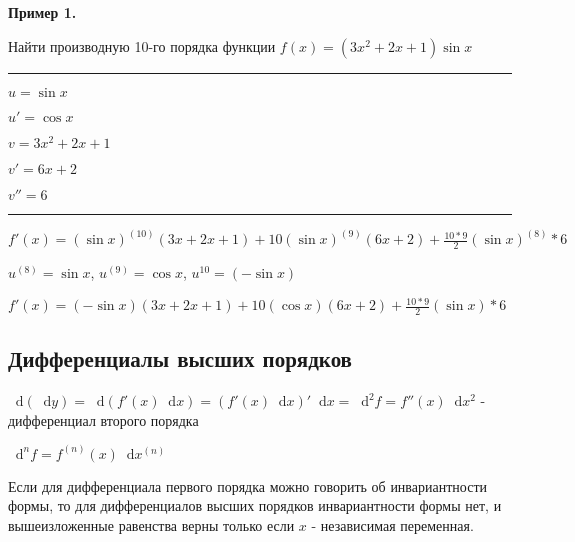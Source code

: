 \documentclass{article}
\newcommand*\diff{\mathop{}\!\mathrm{d}}
\begin{document}
\begin{flushleft}
\textbf{Пример 1.}

Найти производную 10-го порядка функции $f(x) = (3x^2 + 2x + 1) \sin x$

\hfill

\rule{\textwidth}{0.2pt}

\parbox{0.43\textwidth}{
$u = \sin x$

$u' = \cos x$   
}
\parbox{0.45\textwidth}{
$v = 3x^2 + 2x + 1$

$v' = 6x + 2$

$v'' = 6$
}

\rule{\textwidth}{0.2pt}

\hfill

$f'(x) = (\sin x)^{(10)} (3x + 2x + 1) + 10 (\sin x)^{(9)} (6x + 2) + \frac{10 * 9}{2} (\sin x)^{(8)} * 6$

\hfill

$u^{(8)} = \sin x$, $u^{(9)} = \cos x$, $u^{10} = (-\sin x)$

\hfill

$f'(x) = (-\sin x) (3x + 2x + 1) + 10 (\cos x) (6x + 2) + \frac{10 * 9}{2} (\sin x) * 6$

\subsection{Дифференциалы высших порядков}

$\diff (\diff y) = \diff (f'(x) \diff x) = (f' (x) \diff x)' \diff x = \diff^2 f = f''(x) \diff x^2$ - дифференциал второго порядка

$\diff^{n} f = f^{(n)} (x) \diff x^{(n)}$

\hfill

Если для дифференциала первого порядка можно говорить об инвариантности формы, то для дифференциалов высших порядков инвариантности формы нет, и вышеизложенные равенства верны только если $x$ - независимая переменная.

\end{flushleft}
\end{document}
